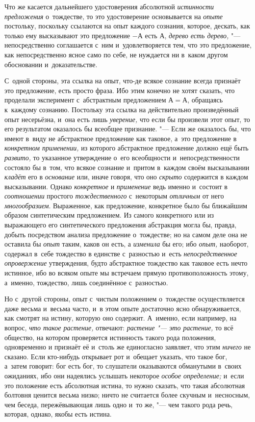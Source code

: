 Что же касается дальнейшего удостоверения абсолютной
{\em истинности предложения} о~тождестве, то это
удостоверение основывается на {\em опыте} постольку,
поскольку ссылаются на опыт каждого сознания, которое, дескать, как только
ему высказывают это предложение $-А$ есть $А$,
{\em дерево есть дерево,} "--- непосредственно соглашается
с~ним и~удовлетворяется тем, что это предложение, как непосредственно ясное
само по себе, не нуждается ни в~каком другом обосновании и~доказательстве.

С~одной стороны, эта ссылка на опыт, что-де всякое сознание всегда признаёт
это предложение, есть просто фраза. Ибо этим конечно не хотят сказать, что
проделали эксперимент с~абстрактным предложением $А=А$,
обращаясь к~каждому сознанию. Постольку эта ссылка на действительно
произведённый опыт несерьёзна, и~она есть лишь
{\em уверение,} что если бы произвели этот опыт, то его
результатом оказалось бы всеобщее признание. "--- Если же оказалось бы, что
имеют в~виду не абстрактное предложение как таковое, а~это предложение в
{\em конкретном применении,} из которого абстрактное
предложение должно ещё быть {\em развито,} то указанное
утверждение о~его всеобщности и~непосредственности состояло бы в~том, что
всякое сознание и~притом в~каждом своём высказывании
{\em кладёт} его в {\em основание}
или, иначе говоря, что оно {\em скрыто} содержится в
каждом высказывании. Однако {\em конкретное} и
{\em применение} ведь именно и~состоит в
{\em соотношении} простого
{\em тождественного} с~некоторым
{\em отличным} от него
{\em многообразием}. Выраженное, как предложение,
конкретное было бы ближайшим образом синтетическим предложением. Из самого
конкретного или из выражающего его синтетического предложения абстракция
могла бы, правда, добыть посредством анализа предложение о~тождестве; но на
самом деле она не оставила бы {\em опыт} таким, каков
он есть, а {\em изменила} бы его; ибо
{\em опыт,} наоборот, содержал в~себе тождество в
единстве с~разностью и~есть {\em непосредственное
опровержение} утверждения, будто абстрактное тождество как таковое есть
нечто истинное, ибо во всяком опыте мы встречаем прямую противоположность
этому, а~именно, тождество, лишь соединённое с~разностью.

Но с~другой стороны, опыт с~чистым положением о~тождестве осуществляется
даже весьма и~весьма часто, и~в этом опыте достаточно ясно обнаруживается,
как смотрят на истину, которую оно содержит. А~именно, если
например, на вопрос, {\em что такое растение,} отвечают:
{\em растение "--- это растение,} то всё общество,
на котором проверяется истинность такого рода положения, одновременно и
признаёт её и~столь же единогласно заявляет, что этим
{\em ничего} не сказано. Если кто-нибудь открывает рот
и~обещает указать, что такое бог, а~затем говорит: бог есть бог, то
слушатели оказываются обманутыми в~своих ожиданиях, ибо они надеялись
услышать некоторое {\em особое определение;} и~если
это положение есть абсолютная истина, то нужно сказать, что такая
абсолютная болтовня ценится весьма низко; ничто не считается более скучным
и~несносным, чем беседа, пережёвывающая лишь одно и~то же, "--- чем такого
рода речь, которая, однако, якобы есть истина.

